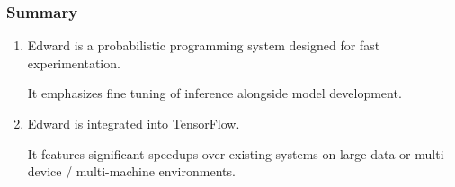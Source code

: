 \documentclass[10pt,
               xcolor={usenames,dvipsnames},
               hyperref={colorlinks,linktoc=all,citecolor=Plum,linkcolor=MidnightBlue,urlcolor=MidnightBlue},noamssymb]{beamer}
\begin{document}




\begin{frame}[c]
\frametitle{Summary}
\begin{enumerate}
\item
Edward is a probabilistic programming system designed for fast
experimentation.

It emphasizes fine tuning of inference alongside model development.
\item
Edward is integrated into TensorFlow.

It features significant speedups over existing systems on large data
or multi-device / multi-machine environments.
\end{enumerate}
\end{frame}
\end{document}

